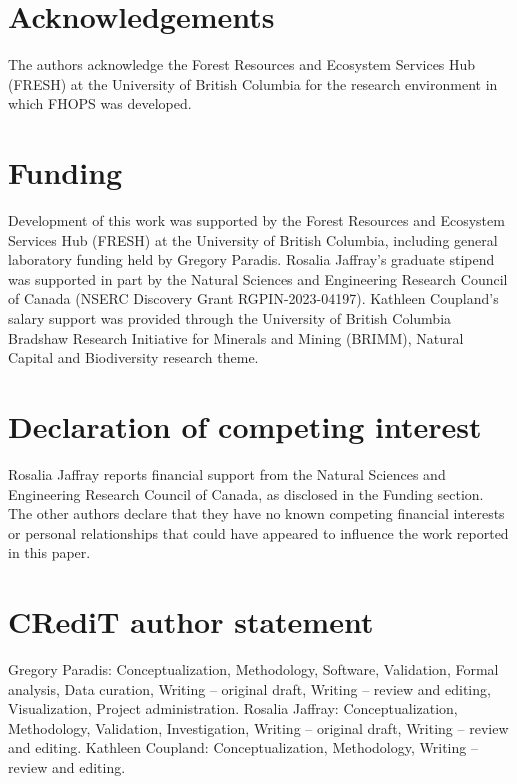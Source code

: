 \section*{Acknowledgements}

The authors acknowledge the Forest Resources and Ecosystem Services Hub (FRESH) at the University of British Columbia for the research environment in which FHOPS was developed.

\section*{Funding}

Development of this work was supported by the Forest Resources and Ecosystem Services Hub (FRESH) at the University of British Columbia, including general laboratory funding held by Gregory Paradis. Rosalia Jaffray's graduate stipend was supported in part by the Natural Sciences and Engineering Research Council of Canada (NSERC Discovery Grant RGPIN-2023-04197). Kathleen Coupland's salary support was provided through the University of British Columbia Bradshaw Research Initiative for Minerals and Mining (BRIMM), Natural Capital and Biodiversity research theme.

\section*{Declaration of competing interest}

Rosalia Jaffray reports financial support from the Natural Sciences and Engineering Research Council of Canada, as disclosed in the Funding section. The other authors declare that they have no known competing financial interests or personal relationships that could have appeared to influence the work reported in this paper.

\section*{CRediT author statement}

Gregory Paradis: Conceptualization, Methodology, Software, Validation, Formal analysis, Data curation, Writing -- original draft, Writing -- review and editing, Visualization, Project administration. 
Rosalia Jaffray: Conceptualization, Methodology, Validation, Investigation, Writing -- original draft, Writing -- review and editing. 
Kathleen Coupland: Conceptualization, Methodology, Writing -- review and editing.

